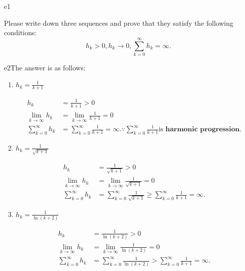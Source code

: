 \documentclass{article}
\begin{document}
\begin{SOLUTION}{e1}
\end{SOLUTION}

\begin{excercise}\label{e2}
Please write down three sequences and prove that they satisfy the following conditions:
\[
 h_k > 0, h_k \to 0, \sum_{k=0}^{\infty} h_k = \infty.
 \]
\end{excercise}

\begin{SOLUTION}{e2}The answer is as follows:
	
	\begin{enumerate}
		\item $h_k = \frac{1}{k+1}$

			\begin{align}
				h_k &= \frac{1}{k+1} >0 \\ 
				\lim_{k \to \infty} h_k &= \lim_{k \to \infty}\frac{1}{k+1} = 0\\
				\sum_{k=0}^{\infty} h_k &= \sum_{k=0}^{\infty} \frac{1}{k+1} = \infty.
				\because \sum_{k=0}^{\infty} \frac{1}{k+1} \text{is }\textbf{harmonic progression}.
			\end{align}
				
		\item $h_k = \frac{1}{\sqrt{k+1} }$

			\begin{align}
				h_k &= \frac{1}{\sqrt{k+1}} >0 \\ 
				\lim_{k \to \infty} h_k &= \lim_{k \to \infty}\frac{1}{\sqrt{k+1}} = 0\\
				\sum_{k=0}^{\infty} h_k &= \sum_{k=0}^{\infty} \frac{1}{\sqrt{k+1}} \ge \sum_{k=0}^{\infty} \frac{1}{k+1} = \infty.
			\end{align}
		\item $h_k = \frac{1}{\ln{(k+2)} }$

			\begin{align}
				h_k &= \frac{1}{\ln{(k+2)}} >0 \\ 
				\lim_{k \to \infty} h_k &= \lim_{k \to \infty}\frac{1}{\ln{(k+2)}} = 0\\
				\sum_{k=0}^{\infty} h_k &= \sum_{k=0}^{\infty} \frac{1}{\ln{(k+2)}} > \sum_{k=0}^{\infty} \frac{1}{k+1} = \infty.
			\end{align}
	\end{enumerate}
\end{SOLUTION}
\end{document}
